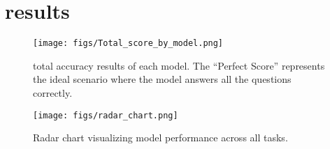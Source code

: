 \section{results}\label{sec:results}


\begin{figure*}[h]
    \centering
    \texttt{[image: figs/Total\_score\_by\_model.png]}
    \caption{total accuracy results of each model. The ``Perfect Score'' represents the ideal scenario where the model answers all the questions correctly.}
    \label{fig:total_score}
\end{figure*}


\begin{figure}[h]
    \centering
    \texttt{[image: figs/radar\_chart.png]}
    \caption{Radar chart visualizing model performance across all tasks.}
    \label{fig:radar_chart}
\end{figure}

